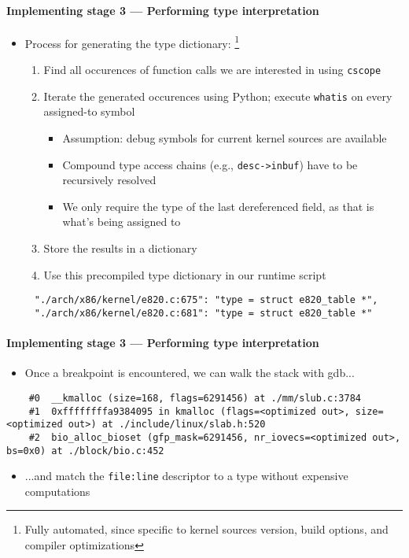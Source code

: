 \documentclass{i20lecture}
\begin{document}
\begin{frame}[fragile]{\insertsection}
  \framesubtitle{Implementing stage 3 --- Performing type interpretation}
    \begin{itemize}
     \item Process for generating the type dictionary: \footnote{Fully automated, since specific to kernel sources version, build options, and compiler optimizations}
\pause
     \begin{enumerate}
      \item Find all occurences of function calls we are interested in using \lstinline|cscope|
\pause
      \item Iterate the generated occurences using Python; execute \lstinline|whatis| on every assigned-to symbol
      \begin{itemize}
\pause
       \item Assumption: debug symbols for current kernel sources are available
\pause
       \item Compound type access chains (e.g., \lstinline|desc->inbuf|) have to be recursively resolved
	\pause
	   \item We only require the type of the last dereferenced field, as that is what's being assigned to
      \end{itemize}
\pause
      \item Store the results in a dictionary
\pause
      \item Use this precompiled type dictionary in our runtime script
\pause
     \end{enumerate}
    \end{itemize}
    \begin{lstlisting}
     "./arch/x86/kernel/e820.c:675": "type = struct e820_table *",
     "./arch/x86/kernel/e820.c:681": "type = struct e820_table *"
    \end{lstlisting}
\end{frame}

\begin{frame}[fragile]{\insertsection}
  \framesubtitle{Implementing stage 3 --- Performing type interpretation}
    \begin{itemize}
     \item Once a breakpoint is encountered, we can walk the stack with gdb...
    \end{itemize}
\pause
    \begin{lstlisting}
    #0  __kmalloc (size=168, flags=6291456) at ./mm/slub.c:3784
    #1  0xffffffffa9384095 in kmalloc (flags=<optimized out>, size=<optimized out>) at ./include/linux/slab.h:520
    #2  bio_alloc_bioset (gfp_mask=6291456, nr_iovecs=<optimized out>, bs=0x0) at ./block/bio.c:452
    \end{lstlisting}
\pause
    \begin{itemize}
     \item ...and match the \lstinline|file:line| descriptor to a type without expensive computations
    \end{itemize}
\end{frame}
\end{document}
